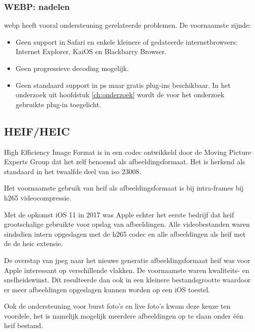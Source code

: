 \subsubsection{WEBP: nadelen}
\label{sec:afbeeldingscompressie-webp-nadelen}

\Gls{webp} heeft vooral ondersteuning gerelateerde problemen. De voornaamste zijnde:

\begin{itemize}
	\item Geen support in Safari en enkele kleinere of gedateerde internetbrowsers: Internet Explorer, KaiOS en Blackbarry Browser.
	
	\item Geen progressieve \gls{decoding} mogelijk.
	
	\item Geen standaard support in \gls{ps} maar gratis \glspl{plug-in} beschikbaar. In het onderzoek uit hoofdstuk \ref{ch:onderzoek} wordt de voor het onderzoek gebruikte \gls{plug-in} toegelicht.
\end{itemize}

\subsection{HEIF/HEIC}
\label{sec:afbeeldingscompressie-heif}

High Efficiency Image Format is in een \gls{codec} ontwikkeld door de Moving Picture Experts Group dat het zelf benoemd als \gls{afbeeldingsformaat}. Het is herkend als standaard in het twaalfde deel van \gls{iso} 23008.

Het voornaamste gebruik van \gls{heif} als \gls{afbeeldingsformaat} is bij \glspl{intra-frame} bij \gls{h265} \gls{videocompressie}.

Met de opkomst iOS 11 in 2017 was Apple echter het eerste bedrijf dat \gls{heif} grootschalige gebruikte voor opslag van afbeeldingen. Alle videobestanden waren sindsdien intern opgeslagen met de \gls{h265} \gls{codec} en alle afbeeldingen als \gls{heif} met de de \gls{heic} \gls{extensie}. 

De overstap van \gls{jpeg} naar het nieuwe generatie \gls{afbeeldingsformaat} \gls{heif} was voor Apple interessant op verschillende vlakken. De voornaamste waren kwaliteits- en snelheidswinst. Dit resulteerde dan ook in een kleinere bestandsgrootte waardoor er meer afbeeldingen opgeslagen kunnen worden op een iOS toestel.

Ook de ondersteuning voor burst foto's en live foto's kwam deze keuze ten voordele, het is namelijk mogelijk meerdere afbeeldingen op te slaan onder één \gls{heif} bestand.

